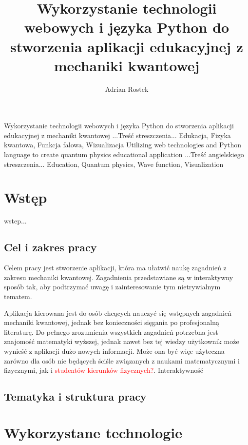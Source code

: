 \documentclass{SGGW-thesis}
\title{Wykorzystanie technologii webowych i języka Python do stworzenia aplikacji edukacyjnej z mechaniki kwantowej}
\author{Adrian Rostek}
\begin{document}
\maketitle
\statementpage
\abstractpage
{Wykorzystanie technologii webowych i języka Python do stworzenia aplikacji edukacyjnej z mechaniki kwantowej}
{...Treść streszczenia...}
{Edukacja, Fizyka kwantowa, Funkcja falowa, Wizualizacja}
{Utilizing web technologies and Python language to create quantum physics educational application}
{...Treść angielskiego streszczenia...}
{Education, Quantum physics, Wave function, Visualization}


{
  \doublespacing
  \tableofcontents
}

\startchapterfromoddpage %

\chapter{Wstęp}
wstep...


	\section{Cel i zakres pracy}
	Celem pracy jest stworzenie aplikacji, która ma ułatwić naukę zagadnień z zakresu mechaniki kwantowej. Zagadnienia przedstawiane są w interaktywny sposób tak, aby podtrzymać uwagę i zainteresowanie tym nietrywialnym tematem.
	
	Aplikacja kierowana jest do osób chcących nauczyć się wstępnych zagadnień mechaniki kwantowej, jednak bez konieczności sięgania po profesjonalną literaturę. Do pełnego zrozumienia wszystkich zagadnień potrzebna jest znajomość matematyki wyższej, jednak nawet bez tej wiedzy użytkownik może wynieść z aplikacji dużo nowych informacji. Może ona być więc użyteczna zarówno dla osób nie będących ściśle związanych z naukami matematycznymi i fizycznymi, jak i \textcolor{red}{studentów kierunków fizycznych?}.
	Interaktywność
	\section{Tematyka i struktura pracy}
	
\chapter{Wykorzystane technologie}
\end{document}
